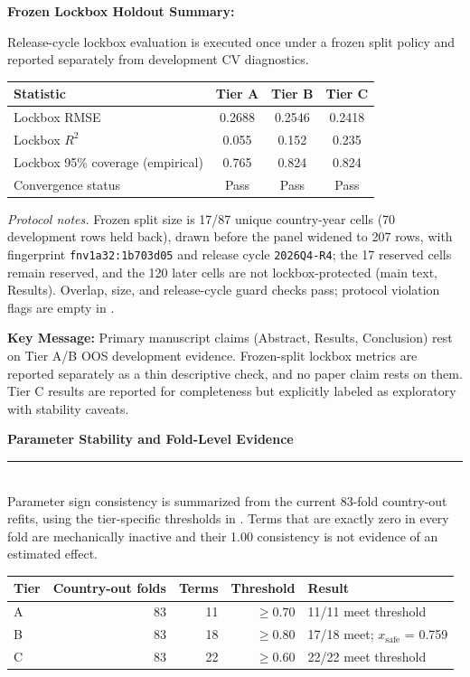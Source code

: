 \documentclass[11pt]{article}
\newcommand{\SubRule}{\color{black}\rule{\linewidth}{0.4pt}}
\newcommand{\Section}[1]{\noindent\textbf{#1}\\[-0.25em]\SubRule\\[0.1em]}
\begin{document}
{\small\textbf{Frozen Lockbox Holdout Summary:}}

\noindent Release-cycle lockbox evaluation is executed once under a frozen split policy and reported separately from development CV diagnostics.

\begin{center}
{\footnotesize
\begin{tabular}{lccc}
\toprule
Statistic & Tier A & Tier B & Tier C \\
\midrule
Lockbox RMSE & 0.2688 & 0.2546 & 0.2418 \\
Lockbox $R^2$ & 0.055 & 0.152 & 0.235 \\
Lockbox 95\% coverage (empirical) & 0.765 & 0.824 & 0.824 \\
Convergence status & Pass & Pass & Pass \\
\bottomrule
\end{tabular}
}
\end{center}

\noindent\textit{Protocol notes.} Frozen split size is 17/87 unique country-year cells (70 development rows held back), drawn before the panel widened to 207 rows, with fingerprint \texttt{fnv1a32:1b703d05} and release cycle \texttt{2026Q4-R4}; the 17 reserved cells remain reserved, and the 120 later cells are not lockbox-protected (main text, Results). Overlap, size, and release-cycle guard checks pass; protocol violation flags are empty in .

\vspace{0.3em}

\noindent\textbf{Key Message:} Primary manuscript claims (Abstract, Results, Conclusion) rest on Tier A/B OOS development evidence. Frozen-split lockbox metrics are reported separately as a thin descriptive check, and no paper claim rests on them. Tier C results are reported for completeness but explicitly labeled as exploratory with stability caveats.

\Section{Parameter Stability and Fold-Level Evidence}

Parameter sign consistency is summarized from the current 83-fold country-out refits, using the tier-specific thresholds in . Terms that are exactly zero in every fold are mechanically inactive and their 1.00 consistency is not evidence of an estimated effect.

{\footnotesize
\begin{center}
\begin{tabularx}{\linewidth}{@{}lrrrl@{}}
\toprule
Tier & Country-out folds & Terms & Threshold & Result \\
\midrule
A & 83 & 11 & $\geq 0.70$ & 11/11 meet threshold \\
B & 83 & 18 & $\geq 0.80$ & 17/18 meet; $x_{\text{safe}}$ = 0.759 \\
C & 83 & 22 & $\geq 0.60$ & 22/22 meet threshold \\
\bottomrule
\end{tabularx}
\end{center}
}
\end{document}
